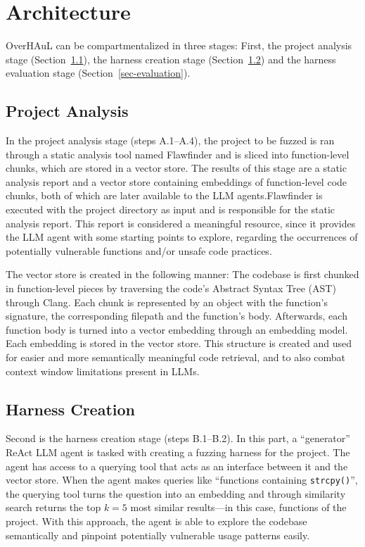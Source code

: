 \documentclass[
  a4paper,
]{scrreprt}
\theoremstyle{definition}
\theoremstyle{remark}
\begin{document}
\section{Architecture}\label{sec-architecture}

OverHAuL can be compartmentalized in three stages: First, the project
analysis stage (Section~\ref{sec-analysis}), the harness creation stage
(Section~\ref{sec-creation}) and the harness evaluation stage
(Section~\ref{sec-evaluation}).

\subsection{Project Analysis}\label{sec-analysis}

In the project analysis stage (steps A.1--A.4), the project to be fuzzed
is ran through a static analysis tool named Flawfinder
\autocite{flawfinder} and is sliced into function-level chunks, which
are stored in a vector store. The results of this stage are a static
analysis report and a vector store containing embeddings of
function-level code chunks, both of which are later available to the LLM
agents.Flawfinder is executed with the project directory as input and is
responsible for the static analysis report. This report is considered a
meaningful resource, since it provides the LLM agent with some starting
points to explore, regarding the occurrences of potentially vulnerable
functions and/or unsafe code practices.

The vector store is created in the following manner: The codebase is
first chunked in function-level pieces by traversing the code's Abstract
Syntax Tree (AST) through Clang. Each chunk is represented by an object
with the function's signature, the corresponding filepath and the
function's body. Afterwards, each function body is turned into a vector
embedding through an embedding model. Each embedding is stored in the
vector store. This structure is created and used for easier and more
semantically meaningful code retrieval, and to also combat context
window limitations present in LLMs.

\subsection{Harness Creation}\label{sec-creation}

Second is the harness creation stage (steps B.1--B.2). In this part, a
``generator'' ReAct LLM agent is tasked with creating a fuzzing harness
for the project. The agent has access to a querying tool that acts as an
interface between it and the vector store. When the agent makes queries
like ``functions containing \texttt{strcpy()}'', the querying tool turns
the question into an embedding and through similarity search returns the
top \(k=5\) most similar results---in this case, functions of the
project. With this approach, the agent is able to explore the codebase
semantically and pinpoint potentially vulnerable usage patterns easily.
\end{document}
